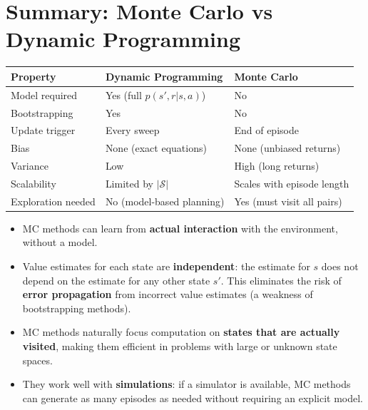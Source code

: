 \documentclass[11pt,a4paper]{article}
\theoremstyle{definition}
\theoremstyle{plain}
\theoremstyle{remark}
\begin{document}
\section{Summary: Monte Carlo vs Dynamic Programming}

\begin{center}
\begin{tabular}{lll}
\hline
\textbf{Property} & \textbf{Dynamic Programming} & \textbf{Monte Carlo} \\
\hline
Model required       & Yes (full $p(s',r|s,a)$)     & No \\
Bootstrapping        & Yes                          & No \\
Update trigger       & Every sweep                  & End of episode \\
Bias                 & None (exact equations)       & None (unbiased returns) \\
Variance             & Low                          & High (long returns) \\
Scalability          & Limited by $|\mathcal{S}|$   & Scales with episode length \\
Exploration needed   & No (model-based planning)    & Yes (must visit all pairs) \\
\hline
\end{tabular}
\end{center}

\begin{tcolorbox}[colback=green!5!white, colframe=green!60!black, title={Core Advantages of Monte Carlo Methods}]
\begin{itemize}
    \item MC methods can learn from \textbf{actual interaction} with the environment, without a model.
    \item Value estimates for each state are \textbf{independent}: the estimate for $s$ does not depend on the estimate for any other state $s'$. This eliminates the risk of \textbf{error propagation} from incorrect value estimates (a weakness of bootstrapping methods).
    \item MC methods naturally focus computation on \textbf{states that are actually visited}, making them efficient in problems with large or unknown state spaces.
    \item They work well with \textbf{simulations}: if a simulator is available, MC methods can generate as many episodes as needed without requiring an explicit model.
\end{itemize}
\end{tcolorbox}
\end{document}
